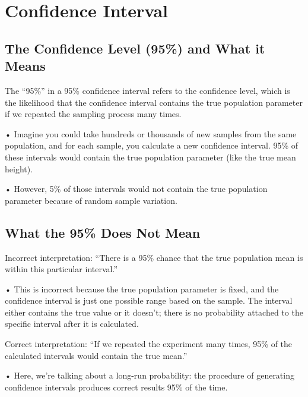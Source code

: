 \documentclass{article}
\begin{document}
\section{Confidence Interval}
\subsection{The Confidence Level (95\%) and What it Means}

The “95\%” in a 95\% confidence interval refers to the confidence level, which is the likelihood that the confidence interval contains the true population parameter if we repeated the sampling process many times.

	•	Imagine you could take hundreds or thousands of new samples from the same population, and for each sample, you calculate a new confidence interval. 95\% of these intervals would contain the true population parameter (like the true mean height).
	
    •	However, 5\% of those intervals would not contain the true population parameter because of random sample variation.

\subsection{What the 95\% Does Not Mean}

Incorrect interpretation: “There is a 95\% chance that the true population mean is within this particular interval.”

•	This is incorrect because the true population parameter is fixed, and the confidence interval is just one possible range based on the sample. The interval either contains the true value or it doesn’t; there is no probability attached to the specific interval after it is calculated.

Correct interpretation: “If we repeated the experiment many times, 95\% of the calculated intervals would contain the true mean.”

•	Here, we're talking about a long-run probability: the procedure of generating confidence intervals produces correct results 95\% of the time.
\end{document}

